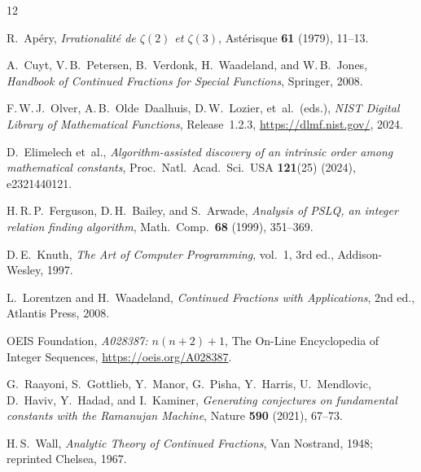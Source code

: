 \documentclass[11pt,a4paper]{article}
\theoremstyle{plain}
\theoremstyle{definition}
\theoremstyle{remark}
\begin{document}
\begin{thebibliography}{12}

R.~Ap\'ery,
\textit{Irrationalit\'e de $\zeta(2)$ et $\zeta(3)$},
Ast\'erisque \textbf{61} (1979), 11--13.

A.~Cuyt, V.\,B.~Petersen, B.~Verdonk, H.~Waadeland,
and W.\,B.~Jones,
\emph{Handbook of Continued Fractions for Special Functions},
Springer, 2008.

F.\,W.\,J.~Olver, A.\,B.~Olde~Daalhuis, D.\,W.~Lozier,
et~al.\ (eds.),
\emph{NIST Digital Library of Mathematical Functions},
Release~1.2.3, \url{https://dlmf.nist.gov/}, 2024.

D.~Elimelech et~al.,
\textit{Algorithm-assisted discovery of an intrinsic order among
mathematical constants},
Proc.\ Natl.\ Acad.\ Sci.\ USA \textbf{121}(25) (2024),
e2321440121.

H.\,R.\,P.~Ferguson, D.\,H.~Bailey, and S.~Arwade,
\textit{Analysis of PSLQ, an integer relation finding algorithm},
Math.\ Comp.\ \textbf{68} (1999), 351--369.

D.\,E.~Knuth,
\emph{The Art of Computer Programming},
vol.~1, 3rd ed., Addison-Wesley, 1997.

L.~Lorentzen and H.~Waadeland,
\emph{Continued Fractions with Applications},
2nd ed., Atlantis Press, 2008.

OEIS Foundation,
\textit{A028387: $n(n{+}2)+1$},
The On-Line Encyclopedia of Integer Sequences,
\url{https://oeis.org/A028387}.

G.~Raayoni, S.~Gottlieb, Y.~Manor, G.~Pisha, Y.~Harris,
U.~Mendlovic, D.~Haviv, Y.~Hadad, and I.~Kaminer,
\textit{Generating conjectures on fundamental constants with the
Ramanujan Machine},
Nature \textbf{590} (2021), 67--73.

H.\,S.~Wall,
\emph{Analytic Theory of Continued Fractions},
Van Nostrand, 1948; reprinted Chelsea, 1967.

\end{thebibliography}
\end{document}
